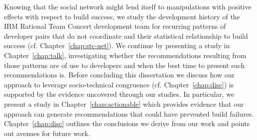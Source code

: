 Knowing that the social network might lend itself to manipulations with positive effects with respect to build success, we study the development history of the IBM Rational Team Concert development team for recurring patterns of developer pairs that do not coordinate and their statistical relationship to build success (cf. Chapter~\ref{chap:stc-net}).
We continue by presenting a study in Chapter~\ref{chap:talk}, investigating whether the recommendations resulting from those patterns are of use to developers and when the best time to present such recommendations is.
Before concluding this dissertation we discuss how our approach to leverage socio-technical congruence (cf. Chapter~\ref{chap:disc}) is supported by the evidence uncovered through our studies.
In particular, we present a study in Chapter~\ref{chap:actionable} which provides evidence that our approach can generate recommendations that could have prevented build failures.
Chapter~\ref{chap:disc} outlines the conclusions we derive from our work and points out avenues for future work.




















